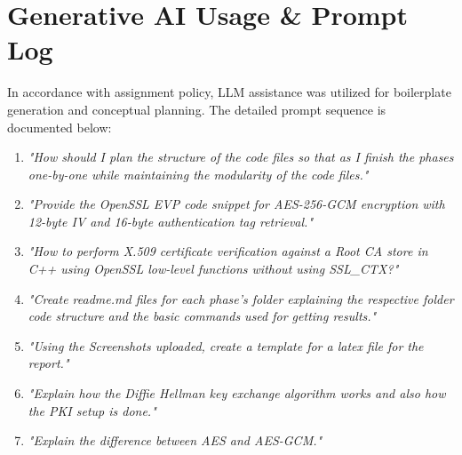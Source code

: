 \documentclass[11pt,a4paper]{article}
\begin{document}
\section{Generative AI Usage \& Prompt Log}
In accordance with assignment policy, LLM assistance was utilized for boilerplate generation and conceptual planning. The detailed prompt sequence is documented below:
\begin{enumerate}
    \item \textit{"How should I plan the structure of the code files so that as I finish the phases one-by-one while maintaining the modularity of the code files."}
    \item \textit{"Provide the OpenSSL EVP code snippet for AES-256-GCM encryption with 12-byte IV and 16-byte authentication tag retrieval."}
    \item \textit{"How to perform X.509 certificate verification against a Root CA store in C++ using OpenSSL low-level functions without using SSL\_CTX?"}
    \item \textit{"Create readme.md files for each phase's folder explaining the respective folder code structure and the basic commands used for getting results."}
    \item \textit{"Using the Screenshots uploaded, create a template for a latex file for the report."}
    \item \textit{"Explain how the Diffie Hellman key exchange algorithm works and also how the PKI setup is done."}
    \item \textit{"Explain the difference between AES and AES-GCM."}
\end{enumerate}
\end{document}
